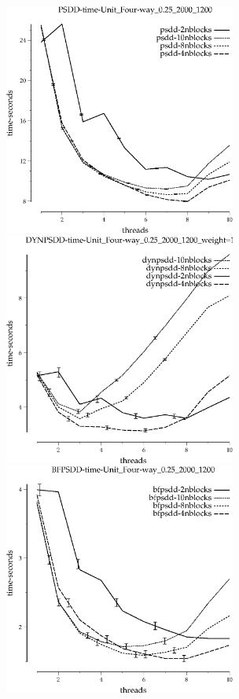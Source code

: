\documentclass{article}
\begin{document}
\begin{appendices}
\begin{figure}[h!]
\includegraphics[width=3in]{../graphs/grid_unit_four-way_0.25_2000_1200/PSDD-time-Unit_Four-way_0.25_2000_1200.eps}
\includegraphics[width=3in]{../graphs/grid_unit_four-way_0.25_2000_1200/DYNPSDD-time-Unit_Four-way_0.25_2000_1200_weight=1.5.eps}
\includegraphics[width=3in]{../graphs/grid_unit_four-way_0.25_2000_1200/BFPSDD-time-Unit_Four-way_0.25_2000_1200.eps}

\end{figure}
\end{appendices}
\end{document}
